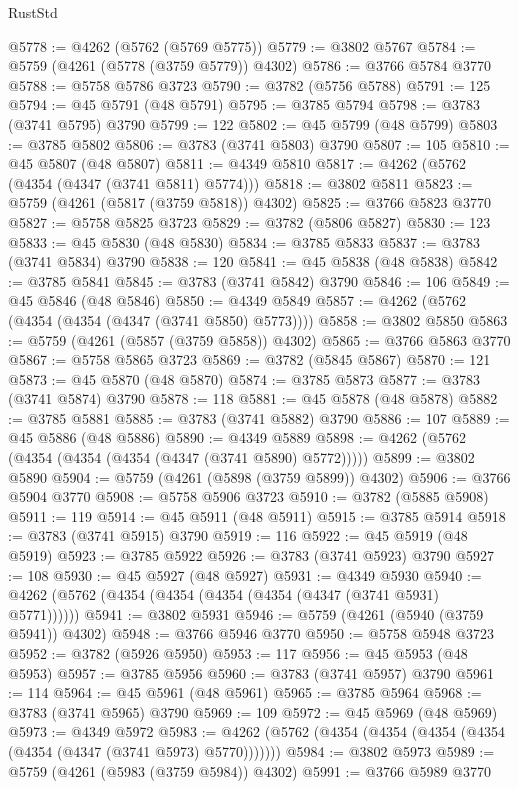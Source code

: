 \begin{lexlean}{RustStd}
\begin{coremodule}
@5778 := @4262 (@5762 (@5769 @5775))
@5779 := @3802 @5767
@5784 := @5759 (@4261 (@5778 (@3759 @5779)) @4302)
@5786 := @3766 @5784 @3770
@5788 := @5758 @5786 @3723
@5790 := @3782 (@5756 @5788)
@5791 := 125
@5794 := @45 @5791 (@48 @5791)
@5795 := @3785 @5794
@5798 := @3783 (@3741 @5795) @3790
@5799 := 122
@5802 := @45 @5799 (@48 @5799)
@5803 := @3785 @5802
@5806 := @3783 (@3741 @5803) @3790
@5807 := 105
@5810 := @45 @5807 (@48 @5807)
@5811 := @4349 @5810
@5817 := @4262 (@5762 (@4354 (@4347 (@3741 @5811) @5774)))
@5818 := @3802 @5811
@5823 := @5759 (@4261 (@5817 (@3759 @5818)) @4302)
@5825 := @3766 @5823 @3770
@5827 := @5758 @5825 @3723
@5829 := @3782 (@5806 @5827)
@5830 := 123
@5833 := @45 @5830 (@48 @5830)
@5834 := @3785 @5833
@5837 := @3783 (@3741 @5834) @3790
@5838 := 120
@5841 := @45 @5838 (@48 @5838)
@5842 := @3785 @5841
@5845 := @3783 (@3741 @5842) @3790
@5846 := 106
@5849 := @45 @5846 (@48 @5846)
@5850 := @4349 @5849
@5857 := @4262 (@5762 (@4354 (@4354 (@4347 (@3741 @5850) @5773))))
@5858 := @3802 @5850
@5863 := @5759 (@4261 (@5857 (@3759 @5858)) @4302)
@5865 := @3766 @5863 @3770
@5867 := @5758 @5865 @3723
@5869 := @3782 (@5845 @5867)
@5870 := 121
@5873 := @45 @5870 (@48 @5870)
@5874 := @3785 @5873
@5877 := @3783 (@3741 @5874) @3790
@5878 := 118
@5881 := @45 @5878 (@48 @5878)
@5882 := @3785 @5881
@5885 := @3783 (@3741 @5882) @3790
@5886 := 107
@5889 := @45 @5886 (@48 @5886)
@5890 := @4349 @5889
@5898 := @4262 (@5762 (@4354 (@4354 (@4354 (@4347 (@3741 @5890) @5772)))))
@5899 := @3802 @5890
@5904 := @5759 (@4261 (@5898 (@3759 @5899)) @4302)
@5906 := @3766 @5904 @3770
@5908 := @5758 @5906 @3723
@5910 := @3782 (@5885 @5908)
@5911 := 119
@5914 := @45 @5911 (@48 @5911)
@5915 := @3785 @5914
@5918 := @3783 (@3741 @5915) @3790
@5919 := 116
@5922 := @45 @5919 (@48 @5919)
@5923 := @3785 @5922
@5926 := @3783 (@3741 @5923) @3790
@5927 := 108
@5930 := @45 @5927 (@48 @5927)
@5931 := @4349 @5930
@5940 := @4262 (@5762 (@4354 (@4354 (@4354 (@4354 (@4347 (@3741 @5931) @5771))))))
@5941 := @3802 @5931
@5946 := @5759 (@4261 (@5940 (@3759 @5941)) @4302)
@5948 := @3766 @5946 @3770
@5950 := @5758 @5948 @3723
@5952 := @3782 (@5926 @5950)
@5953 := 117
@5956 := @45 @5953 (@48 @5953)
@5957 := @3785 @5956
@5960 := @3783 (@3741 @5957) @3790
@5961 := 114
@5964 := @45 @5961 (@48 @5961)
@5965 := @3785 @5964
@5968 := @3783 (@3741 @5965) @3790
@5969 := 109
@5972 := @45 @5969 (@48 @5969)
@5973 := @4349 @5972
@5983 := @4262 (@5762 (@4354 (@4354 (@4354 (@4354 (@4354 (@4347 (@3741 @5973) @5770)))))))
@5984 := @3802 @5973
@5989 := @5759 (@4261 (@5983 (@3759 @5984)) @4302)
@5991 := @3766 @5989 @3770

\end{coremodule}
\end{lexlean}
